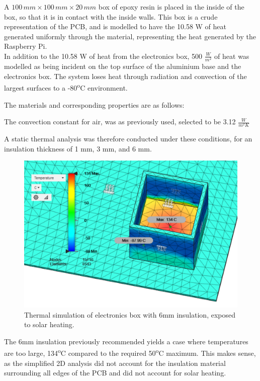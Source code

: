 A $100\,mm \times 100\,mm \times 20\,mm$ box of epoxy resin is placed in the inside of the box, so that it is in contact with the inside walls. This box is a crude representation of the PCB, and is modelled to have the 10.58 W of heat generated uniformly through the material, representing the heat generated by the Raspberry Pi. \\

In addition to the 10.58 W of heat from the electronics box, 500 $\frac{W}{m^{2}}$ of heat was modelled as being incident on the top surface of the aluminium base and the electronics box. The system loses heat through radiation and convection of the largest surfaces to a -80\textsuperscript{o}C environment. 

The materials and corresponding properties are as follows:



The convection constant for air, was as previously used, selected to be 3.12 $\frac{W}{m^2 K} $

A static thermal analysis was therefore conducted under these conditions, for an insulation thickness of 1 mm, 3 mm, and 6 mm. 

	\begin{figure}[h!]
    \centering	
	\includegraphics[scale=0.58]{4-experiment-design/img/mechanical/6mmthickheat.PNG}
	\caption{Thermal simulation of electronics box with 6mm insulation, exposed to solar heating.}
	\label{fig:6mmthickheat}
    	\end{figure}

The 6mm insulation previously recommended yields a case where temperatures are too large, 134\textsuperscript{o}C compared to the required 50\textsuperscript{o}C maximum. This makes sense, as the simplified 2D analysis did not account for the insulation material surrounding all edges of the PCB and did not account for solar heating. 

